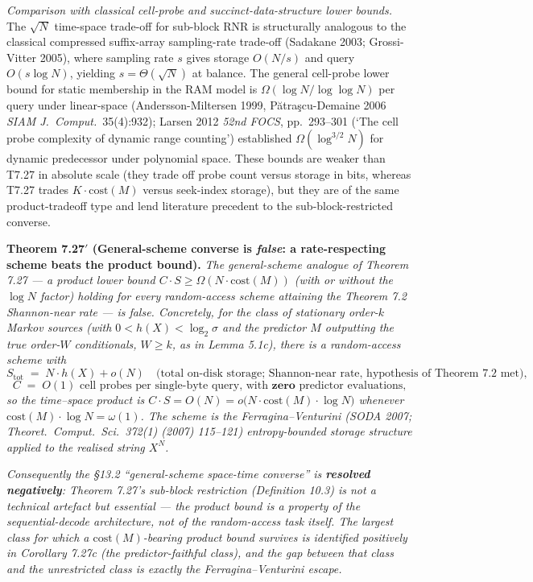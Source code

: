 \documentclass[
]{article}
\begin{document}
\emph{Comparison with classical cell-probe and succinct-data-structure
lower bounds.} The $\sqrt{N}$ time-space trade-off for sub-block
RNR is structurally analogous to the classical compressed
suffix-array sampling-rate trade-off (Sadakane 2003;
Grossi-Vitter 2005), where sampling rate $s$ gives storage $O(N/s)$
and query $O(s \log N)$, yielding $s = \Theta(\sqrt{N})$ at balance.
The general cell-probe lower bound for static membership in the
RAM model is $\Omega(\log N / \log\log N)$ per query under
linear-space (Andersson-Miltersen 1999, Pătraşcu-Demaine 2006
\emph{SIAM J.\ Comput.}\ 35(4):932); Larsen 2012
\emph{52nd FOCS}, pp.\ 293--301 (`The cell probe complexity of
dynamic range counting') established $\Omega(\log^{3/2} N)$ for
dynamic predecessor under polynomial space. These bounds are
weaker than T7.27 in absolute scale (they trade off probe count
versus storage in bits, whereas T7.27 trades $K \cdot \mathrm{cost}(M)$
versus seek-index storage), but they are of the same product-tradeoff
type and lend literature precedent to the sub-block-restricted
converse.

\textbf{Theorem 7.27$'$ (General-scheme converse is \emph{false}: a
rate-respecting scheme beats the product bound).} \emph{The
general-scheme analogue of Theorem 7.27 --- a product lower bound
$C \cdot S \geq \Omega(N \cdot \mathrm{cost}(M))$ (with or without the
$\log N$ factor) holding for every random-access scheme attaining the
Theorem 7.2 Shannon-near rate --- is false. Concretely, for the class of
stationary order-$k$ Markov sources (with $0 < h(X) < \log_2 \sigma$ and
the predictor $M$ outputting the true order-$W$ conditionals, $W \geq
k$, as in Lemma 5.1c), there is a random-access scheme with}
\[
  S_{\mathrm{tot}} \;=\; N \cdot h(X) + o(N) \quad\text{(total on-disk
  storage; Shannon-near rate, hypothesis of Theorem 7.2 met)},
\]
\[
  C \;=\; O(1) \text{ cell probes per single-byte query, with }
  \textbf{zero}\text{ predictor evaluations,}
\]
\emph{so the time--space product is $C \cdot S = O(N) = o\bigl(N \cdot
\mathrm{cost}(M) \cdot \log N\bigr)$ whenever $\mathrm{cost}(M) \cdot
\log N = \omega(1)$. The scheme is the Ferragina--Venturini (SODA 2007;
\emph{Theoret.\ Comput.\ Sci.}\ 372(1) (2007) 115--121) entropy-bounded
storage structure applied to the realised string $X^N$.}

\emph{Consequently the §13.2 ``general-scheme space-time converse'' is
\textbf{resolved negatively}: Theorem 7.27's sub-block restriction
(Definition 10.3) is not a technical artefact but \emph{essential} ---
the product bound is a property of the sequential-decode architecture,
not of the random-access task itself. The largest class for which a
$\mathrm{cost}(M)$-bearing product bound survives is identified
positively in Corollary 7.27c (the predictor-faithful class), and the
gap between that class and the unrestricted class is exactly the
Ferragina--Venturini escape.}
\end{document}

